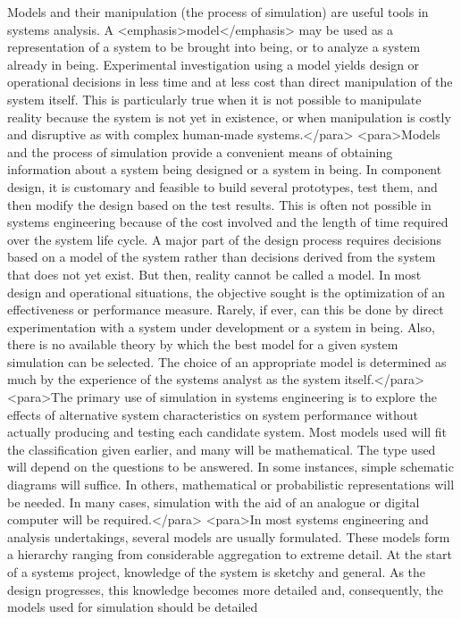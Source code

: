 Models and their manipulation (the process of simulation) are useful tools in systems analysis. A <emphasis>model</emphasis> may be used as a representation of a system to be brought into being, or to analyze a system already in being. Experimental investigation using a model yields design or operational decisions in less time and at less cost than direct manipulation of the system itself. This is particularly true when it is not possible to manipulate reality because the system is not yet in existence, or when manipulation is costly and disruptive as with complex human-made systems.</para>
	<para>Models and the process of simulation provide a convenient means of obtaining information about a system being designed or a system in being. In component design, it is customary and feasible to build several prototypes, test them, and then modify the design based on the test results. This is often not possible in systems engineering because of the cost involved and the length of time required over the system life cycle. A major part of the design process requires decisions based on a model of the system rather than decisions derived from the system that does not yet exist. But then, reality cannot be called a model.
	In most design and operational situations, the objective sought is the optimization of an effectiveness or performance measure. Rarely, if ever, can this be done by direct experimentation with a system under development or a system in being. Also, there is no available theory by which the best model for a given system simulation can be selected. The choice of an appropriate model is determined as much by the experience of the systems analyst as the system itself.</para>
<para>The primary use of simulation in systems engineering is to explore the effects of alternative system characteristics on system performance without actually producing and testing each candidate system. Most models used will fit the classification given earlier, and many will be mathematical. The type used will depend on the questions to be answered. In some instances, simple schematic diagrams will suffice. In others, mathematical or probabilistic representations will be needed. In many cases, simulation with the aid of an analogue or digital computer will be required.</para>
<para>In most systems engineering and analysis undertakings, several models are usually formulated. These models form a hierarchy ranging from considerable aggregation to extreme detail. At the start of a systems project, knowledge of the system is sketchy and general. As the design progresses, this knowledge becomes more detailed and, consequently, the models used for simulation should be detailed